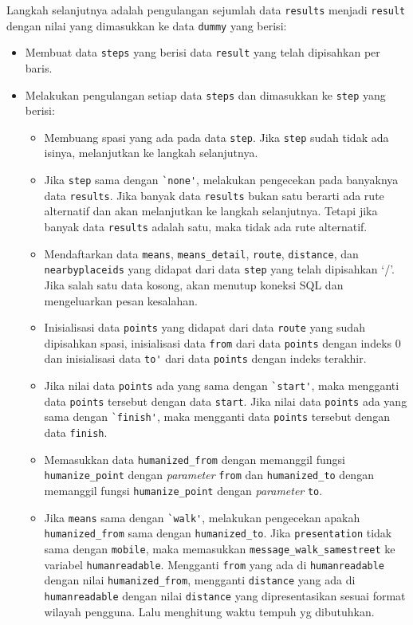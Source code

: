 Langkah selanjutnya adalah pengulangan sejumlah data \verb!results! menjadi \verb!result! dengan nilai yang dimasukkan ke data \verb!dummy! yang berisi:
\begin{itemize}
	\item Membuat data \verb!steps! yang berisi data \verb!result! yang telah dipisahkan per baris.
	\item Melakukan pengulangan setiap data \verb!steps! dan dimasukkan ke \verb!step! yang berisi:
	\begin{itemize}
		\item Membuang spasi yang ada pada data \verb!step!. Jika \verb!step! sudah tidak ada isinya, melanjutkan ke langkah selanjutnya.
		\item Jika \verb!step! sama dengan \verb!`none'!, melakukan pengecekan pada banyaknya data \verb!results!. Jika banyak data \verb!results! bukan satu berarti ada rute alternatif dan akan melanjutkan ke langkah selanjutnya. Tetapi jika banyak data \verb!results! adalah satu, maka tidak ada rute alternatif.
		\item Mendaftarkan data \verb!means!, \verb!means_detail!, \verb!route!, \verb!distance!, dan \verb!nearbyplaceids! yang didapat dari data \verb!step! yang telah dipisahkan `/'. Jika salah satu data kosong, akan menutup koneksi SQL dan mengeluarkan pesan kesalahan.
		\item Inisialisasi data \verb!points! yang didapat dari data \verb!route! yang sudah dipisahkan spasi, inisialisasi data \verb!from! dari data \verb!points! dengan indeks 0 dan inisialisasi data \verb!to'! dari data \verb!points! dengan indeks terakhir.
		\item Jika nilai data \verb!points! ada yang sama dengan \verb!`start'!, maka mengganti data \verb!points! tersebut dengan data \verb!start!. Jika nilai data \verb!points! ada yang sama dengan \verb!`finish'!, maka mengganti data \verb!points! tersebut dengan data \verb!finish!.
		 \item Memasukkan data \verb!humanized_from! dengan memanggil fungsi \verb!humanize_point! dengan \textit{parameter} \verb!from! dan \verb!humanized_to! dengan memanggil fungsi \verb!humanize_point! dengan \textit{parameter} \verb!to!.
		 \item Jika \verb!means! sama dengan \verb!`walk'!, melakukan pengecekan apakah  \verb!humanized_from! sama dengan \verb!humanized_to!. Jika \verb!presentation! tidak sama dengan \verb!mobile!, maka memasukkan \verb!message_walk_samestreet! ke variabel \verb!humanreadable!. Mengganti \verb!from! yang ada di \verb!humanreadable! dengan nilai \verb!humanized_from!, mengganti \verb!distance! yang ada di \verb!humanreadable! dengan nilai \verb!distance! yang dipresentasikan sesuai format wilayah pengguna. Lalu menghitung waktu tempuh yg dibutuhkan.

\end{itemize}
\end{itemize}
